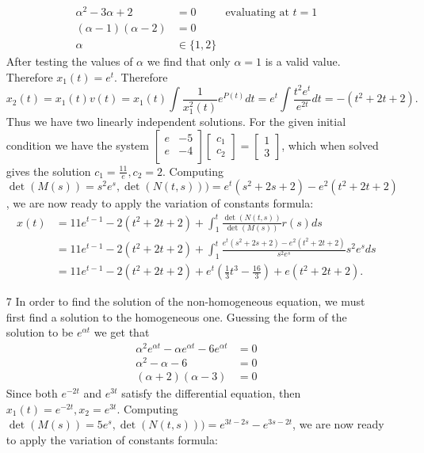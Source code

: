 \documentclass[12pt, letterpaper]{article}
\begin{document}
\begin{enumerate}
\begin{align*}
		\alpha^2 -3\alpha +2 &= 0 & \text{evaluating at } t=1\\
		(\alpha - 1)(\alpha - 2) &= 0\\
		\alpha &\in \{ 1,2 \}
	\end{align*}
	After testing the values of $\alpha$ we find that only $\alpha = 1$ is a valid value.  Therefore $x_1 (t) = e^t$.
	Therefore $$x_2(t) = x_1(t) v(t) = x_1(t) \int \frac{1}{x_1^2(t)} e^{P(t)} dt = e^t \int \frac{t^2 e^t}{e^{2t}}dt = - (t^2 + 2t +2).$$
	Thus we have two linearly independent solutions. For the given initial condition we have the system $\begin{bmatrix} e & -5 \\ e & -4\\ \end{bmatrix} \begin{bmatrix} c_1 \\ c_2 \end{bmatrix} = \begin{bmatrix} 1 \\ 3 \end{bmatrix}$, which when solved gives the solution $c_1 = \frac{11}{e}, c_2 = 2$.  
	Computing $\det (M(s)) = s^2 e^s, \det (N(t,s))) = e^t(s^2 + 2s + 2) - e^2(t^2 +2t+2)$, we are now ready to apply the variation of constants formula:
	\begin{align*}
		x(t) &= 11e^{t-1} -2(t^2 + 2t +2) + \int_1^t \frac{\det(N(t,s))}{\det(M(s))} r(s) ds\\
		&= 11e^{t-1} -2(t^2 + 2t +2) + \int_1^t \frac{e^t(s^2 + 2s + 2) - e^2(t^2 +2t+2)}{s^2 e^s}s^2 e^s ds\\
		&= 11e^{t-1} -2(t^2 + 2t +2) + e^t(\frac{1}{3}t^3 - \frac{16}{3}) + e(t^2+2t+2).
	\end{align*}	  
	\item[7]
	 In order to find the solution of the non-homogeneous equation, we must first find a solution to the homogeneous one.  Guessing the form of the solution to be $e^{\alpha t}$ we get that 
	 \begin{align*}
	 \alpha^2 e^{\alpha t} - \alpha e^{\alpha t} -6 e^{\alpha t} &= 0\\
	 \alpha^2 - \alpha - 6 &= 0\\
	 (\alpha + 2)(\alpha - 3) &= 0
	 \end{align*}
	 Since both $e^{-2t}$ and $e^{3t}$ satisfy the differential equation, then $x_1(t) = e^{-2t}, x_2 = e^{3t}$.   
	 Computing $\det (M(s)) = 5 e^s, \det (N(t,s))) = e^{3t -2s} -e^{3s-2t}$, we are now ready to apply the variation of constants formula:

\end{enumerate}
\end{document}
